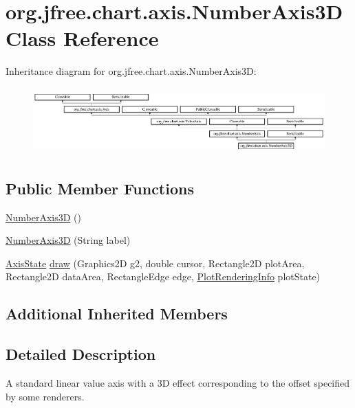 \hypertarget{classorg_1_1jfree_1_1chart_1_1axis_1_1_number_axis3_d}{}\section{org.\+jfree.\+chart.\+axis.\+Number\+Axis3D Class Reference}
\label{classorg_1_1jfree_1_1chart_1_1axis_1_1_number_axis3_d}
Inheritance diagram for org.\+jfree.\+chart.\+axis.\+Number\+Axis3D\+:\begin{figure}[H]
\begin{center}
\leavevmode
\includegraphics[height=2.592592cm]{classorg_1_1jfree_1_1chart_1_1axis_1_1_number_axis3_d}
\end{center}
\end{figure}
\subsection*{Public Member Functions}
\begin{DoxyCompactItemize}
\item 
\mbox{\hyperlink{classorg_1_1jfree_1_1chart_1_1axis_1_1_number_axis3_d_a8629e3c9ca9d505ab426b92ceded41b3}{Number\+Axis3D}} ()
\item 
\mbox{\hyperlink{classorg_1_1jfree_1_1chart_1_1axis_1_1_number_axis3_d_af866b33cb1ad3ce0cb80a97cb2b1afd7}{Number\+Axis3D}} (String label)
\item 
\mbox{\hyperlink{classorg_1_1jfree_1_1chart_1_1axis_1_1_axis_state}{Axis\+State}} \mbox{\hyperlink{classorg_1_1jfree_1_1chart_1_1axis_1_1_number_axis3_d_a85c6ea6370195b25f3e4519a5cd02d3a}{draw}} (Graphics2D g2, double cursor, Rectangle2D plot\+Area, Rectangle2D data\+Area, Rectangle\+Edge edge, \mbox{\hyperlink{classorg_1_1jfree_1_1chart_1_1plot_1_1_plot_rendering_info}{Plot\+Rendering\+Info}} plot\+State)
\end{DoxyCompactItemize}
\subsection*{Additional Inherited Members}


\subsection{Detailed Description}
A standard linear value axis with a 3D effect corresponding to the offset specified by some renderers. 

